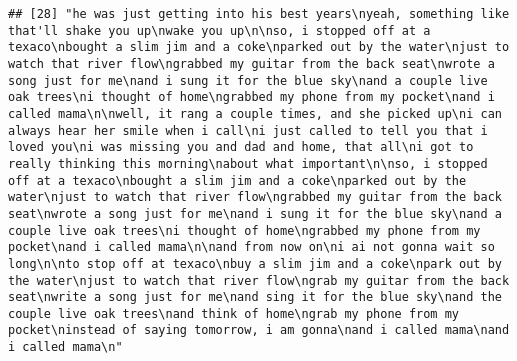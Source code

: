 \documentclass[]{article}
\begin{document}
\begin{verbatim}
## [28] "he was just getting into his best years\nyeah, something like that'll shake you up\nwake you up\n\nso, i stopped off at a texaco\nbought a slim jim and a coke\nparked out by the water\njust to watch that river flow\ngrabbed my guitar from the back seat\nwrote a song just for me\nand i sung it for the blue sky\nand a couple live oak trees\ni thought of home\ngrabbed my phone from my pocket\nand i called mama\n\nwell, it rang a couple times, and she picked up\ni can always hear her smile when i call\ni just called to tell you that i loved you\ni was missing you and dad and home, that all\ni got to really thinking this morning\nabout what important\n\nso, i stopped off at a texaco\nbought a slim jim and a coke\nparked out by the water\njust to watch that river flow\ngrabbed my guitar from the back seat\nwrote a song just for me\nand i sung it for the blue sky\nand a couple live oak trees\ni thought of home\ngrabbed my phone from my pocket\nand i called mama\n\nand from now on\ni ai not gonna wait so long\n\nto stop off at texaco\nbuy a slim jim and a coke\npark out by the water\njust to watch that river flow\ngrab my guitar from the back seat\nwrite a song just for me\nand sing it for the blue sky\nand the couple live oak trees\nand think of home\ngrab my phone from my pocket\ninstead of saying tomorrow, i am gonna\nand i called mama\nand i called mama\n"                                                                                                                                                                                                                                                                                                                                                                                                                                                                                                                                                                                                                                                                                                                                                                                                                                                                                                                                                                                                                                                                                                                                                                                                                                                                                                                                                                                                                                                                                                                                                    

\end{verbatim}
\end{document}
